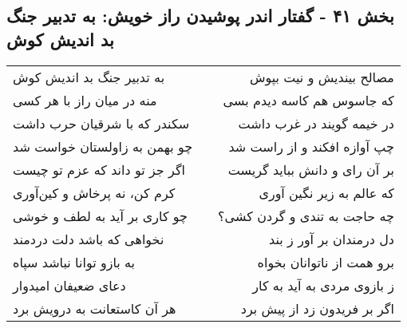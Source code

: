 \begin{center}
\section*{بخش ۴۱ - گفتار اندر پوشیدن راز خویش: به تدبیر جنگ بد اندیش کوش}
\label{sec:041}
\begin{longtable}{l p{0.5cm} r}
به تدبیر جنگ بد اندیش کوش
&&
مصالح بیندیش و نیت بپوش
\\
منه در میان راز با هر کسی
&&
که جاسوس هم کاسه دیدم بسی
\\
سکندر که با شرقیان حرب داشت
&&
در خیمه گویند در غرب داشت
\\
چو بهمن به زاولستان خواست شد
&&
چپ آوازه افکند و از راست شد
\\
اگر جز تو داند که عزم تو چیست
&&
بر آن رای و دانش بباید گریست
\\
کرم کن، نه پرخاش و کین‌آوری
&&
که عالم به زیر نگین آوری
\\
چو کاری بر آید به لطف و خوشی
&&
چه حاجت به تندی و گردن کشی؟
\\
نخواهی که باشد دلت دردمند
&&
دل درمندان بر آور ز بند
\\
به بازو توانا نباشد سپاه
&&
برو همت از ناتوانان بخواه
\\
دعای ضعیفان امیدوار
&&
ز بازوی مردی به آید به کار
\\
هر آن کاستعانت به درویش برد
&&
اگر بر فریدون زد از پیش برد
\\
\end{longtable}
\end{center}
